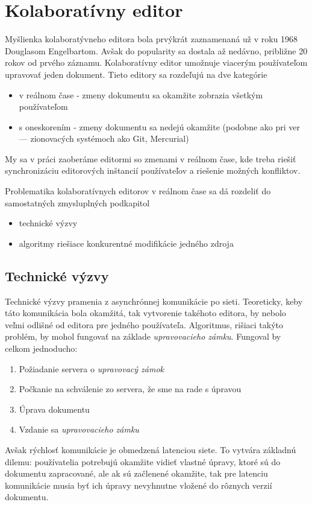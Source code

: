 \chapter{Kolaboratívny editor}

\label{kap:zdialtelnost} %

Myšlienka kolaboratývneho editora bola prvýkrát zaznamenaná už v roku 1968 Douglasom Engelbartom. 
Avšak do popularity sa dostala až nedávno, približne 20 rokov od prvého záznamu.
Kolaboratívny editor umožnuje viacerým používateľom upravovať jeden dokument.
Tieto editory sa rozdeľujú na dve kategórie
\begin{itemize}
  \item v reálnom čase - zmeny dokumentu sa okamžite zobrazia všetkým používateľom
  \item s oneskorením - zmeny dokumentu sa nedejú okamžite (podobne ako pri ver --- zionovacých
  systémoch ako Git, Mercurial)
\end{itemize}
My sa v práci zaoberáme editormi so zmenami v reálnom čase, kde treba
riešiť synchronizáciu editorových inštancií používateľov a riešenie možných konfliktov.

Problematika kolaboratívnych editorov v reálnom čase sa dá rozdeliť do samostatných zmysluplných 
podkapitol
\begin{itemize}
\item  technické výzvy
\item  algoritmy riešiace konkurentné modifikácie jedného zdroja
\end{itemize}

\section{Technické výzvy}
Technické výzvy pramenia z asynchrónnej komunikácie po sieti. Teoreticky, keby táto 
komunikácia bola okamžitá, tak vytvorenie takéhoto editora, by nebolo veľmi odlišné od
editora pre jedného používateľa. Algoritmus\label{algo:nesubezne_editovanie}, 
rišiaci takýto problém,  by mohol fungovať na  základe 
\textit{upravovacieho zámku}. Fungoval by celkom jednoducho:
\begin{enumerate}
  \item Požiadanie servera o \textit{upravovacý zámok}
  \item Počkanie na schválenie zo servera, že sme na rade s úpravou
  \item Úprava dokumentu
  \item Vzdanie sa \textit{upravovacieho zámku}
\end{enumerate}
Avšak rýchlosť komunikácie je obmedzená latenciou siete. To vytvára základnú dilemu: 
používatelia potrebujú okamžite vidieť vlastné úpravy, ktoré sú do dokumentu zapracované,
ale ak sú začlenené okamžite, tak pre latenciu komunikácie musia byť ich
úpravy nevyhnutne vložené do rôznych verzií dokumentu.

